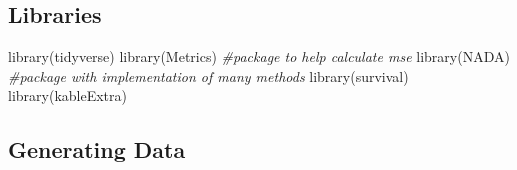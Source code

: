 \documentclass[12pt, twoside]{amherstthesis}
\newenvironment{Shaded}{\begin{snugshade}}{\end{snugshade}}
\newcommand{\CommentTok}[1]{\textcolor[rgb]{0.56,0.35,0.01}{\textit{#1}}}
\newcommand{\FunctionTok}[1]{\textcolor[rgb]{0.00,0.00,0.00}{#1}}
\newcommand{\NormalTok}[1]{#1}
\begin{document}
\hypertarget{libraries}{%
\subsection{Libraries}\label{libraries}}
\begin{Shaded}
\begin{Highlighting}[]
\FunctionTok{library}\NormalTok{(tidyverse)}
\FunctionTok{library}\NormalTok{(Metrics) }\CommentTok{\#package to help calculate mse}
\FunctionTok{library}\NormalTok{(NADA) }\CommentTok{\#package with implementation of many methods}
\FunctionTok{library}\NormalTok{(survival)}
\FunctionTok{library}\NormalTok{(kableExtra)}
\end{Highlighting}
\end{Shaded}
\hypertarget{generating-data}{%
\subsection{Generating Data}\label{generating-data}}
\end{document}
